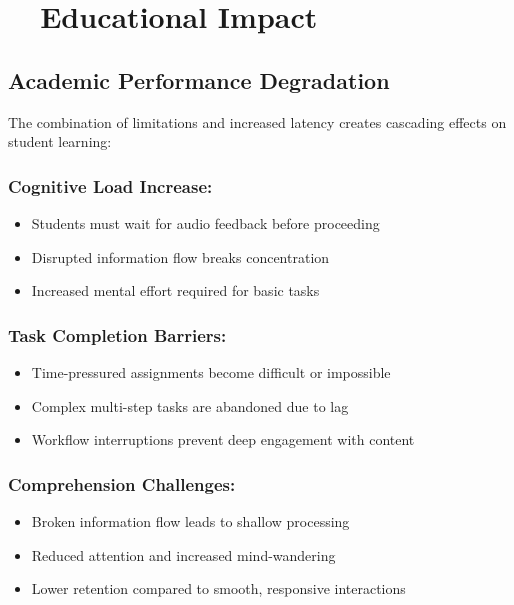 \section{~~Educational Impact}\label{educational-impact}

\subsection{Academic Performance Degradation}\label{academic-performance-degradation}

The combination of  limitations and increased latency creates cascading effects on student learning:

\subsubsection{Cognitive Load Increase:}
\begin{itemize}
	\item Students must wait for audio feedback before proceeding \supercite{Sweller1988CognitiveLoadTheory}
	\item Disrupted information flow breaks concentration \supercite{Parasuraman2008CognitiveWorkload}
	\item Increased mental effort required for basic  tasks \supercite{Wickens2008MultipleResourceTheory}
\end{itemize}

\subsubsection{Task Completion Barriers:}

\begin{itemize}
	\item Time-pressured assignments become difficult or impossible \supercite{Adams2000ImpactOfTechnology}
	\item Complex multi-step tasks are abandoned due to lag \supercite{Kirschner2006WhyMinimalGuidance}
	\item Workflow interruptions prevent deep engagement with content \supercite{Pashler1994DualTaskInterference}
\end{itemize}

\subsubsection{Comprehension Challenges:}

\begin{itemize}
	\item Broken information flow leads to shallow processing \supercite{Craik1972LevelsOfProcessing}
	\item Reduced attention and increased mind-wandering \supercite{Smallwood2011MindWandering}
	\item Lower retention compared to smooth, responsive interactions \supercite{Kintsch1998Comprehension}
\end{itemize}

